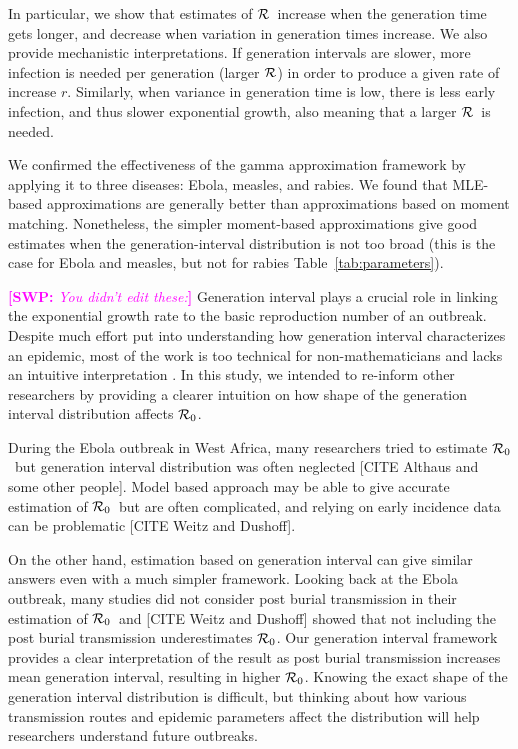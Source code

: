 \documentclass[12pt,]{article}
\newcommand{\RR}{\ensuremath{{\cal R}}}
\newcommand{\Rx}[1]{\ensuremath{{\cal R}_{#1}}}
\newcommand{\Ro}{\Rx{0}}
\newcommand{\tref}[1]{Table~\ref{tab:#1}}
\newcommand{\comment}[3]{\textcolor{#1}{\textbf{[#2: }\textit{#3}\textbf{]}}}
\newcommand{\swp}[1]{\comment{magenta}{SWP}{#1}}
\begin{document}
In particular, we show that estimates of \RR\ increase when the generation time gets longer, and decrease when variation in generation times increase. We also provide mechanistic interpretations. If generation intervals are slower, more infection is needed per generation (larger \RR)  in order to produce a given rate of increase $r$. Similarly, when variance in generation time is low, there is less early infection, and thus slower exponential growth, also meaning that a larger \RR\ is needed. 

We confirmed the effectiveness of the gamma approximation framework by applying it to three diseases: Ebola, measles, and rabies. 
We found that MLE-based approximations are generally better than approximations based on moment matching. Nonetheless, the simpler moment-based approximations give good estimates when the generation-interval distribution is not too broad (this is the case for Ebola and measles, but not for rabies \tref{parameters}).

\swp{You didn't edit these:}
Generation interval plays a crucial role in linking the exponential growth rate to the basic reproduction number of an outbreak.
Despite much effort put into understanding how generation interval characterizes an epidemic, most of the work is too technical for non-mathematicians and lacks an intuitive interpretation \cite{WallLips07,Sven07,Sven15,Nish10}.
In this study, we intended to re-inform other researchers by providing a clearer intuition on how shape of the generation interval distribution affects \Ro.

During the Ebola outbreak in West Africa, many researchers tried to estimate \Ro\ but generation interval distribution was often neglected [CITE Althaus and some other people].
Model based approach may be able to give accurate estimation of \Ro\ but are often complicated, and relying on early incidence data can be problematic [CITE Weitz and Dushoff].

On the other hand, estimation based on generation interval can give similar answers even with a much simpler framework.
Looking back at the Ebola outbreak, many studies did not consider post burial transmission in their estimation of \Ro\ and [CITE Weitz and Dushoff] showed that not including the post burial transmission underestimates \Ro.
Our generation interval framework provides a clear interpretation of the result as post burial transmission increases mean generation interval, resulting in higher \Ro.
Knowing the exact shape of the generation interval distribution is difficult, but thinking about how various transmission routes and epidemic parameters affect the distribution will help researchers understand future outbreaks.
\end{document}
